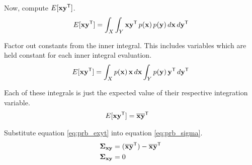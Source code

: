 Now, compute $E[\mathbf{x}\mathbf{y}^\mathsf{T}]$.
\begin{equation*}
  E[\mathbf{x}\mathbf{y}^\mathsf{T}] = \int_X \int_Y \mathbf{x}\mathbf{y}^\mathsf{T} \,p(\mathbf{x})
    \,p(\mathbf{y}) \,d\mathbf{x} \,d\mathbf{y}^\mathsf{T}
\end{equation*}

Factor out constants from the inner integral. This includes variables which are
held constant for each inner integral evaluation.
\begin{equation*}
  E[\mathbf{x}\mathbf{y}^\mathsf{T}] = \int_X p(\mathbf{x}) \,\mathbf{x} \,d\mathbf{x}
    \int_Y p(\mathbf{y}) \,\mathbf{y}^\mathsf{T} \,d\mathbf{y}^\mathsf{T}
\end{equation*}

Each of these integrals is just the expected value of their respective
integration variable.
\begin{align}
  E[\mathbf{x}\mathbf{y}^\mathsf{T}] &= \overline{\mathbf{x}}\overline{\mathbf{y}}^\mathsf{T} \label{eq:prb_exyt}
\end{align}

Substitute equation \eqref{eq:prb_exyt} into equation \eqref{eq:prb_sigma}.
\begin{align*}
  \mathbf{\Sigma}_{\mathbf{x}\mathbf{y}} &= (\overline{\mathbf{x}}\overline{\mathbf{y}}^\mathsf{T}) -
    \overline{\mathbf{x}}\overline{\mathbf{y}}^\mathsf{T} \\
  \mathbf{\Sigma}_{\mathbf{x}\mathbf{y}} &= 0
\end{align*}


